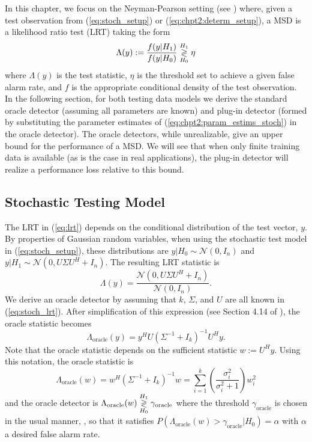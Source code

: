 In this chapter, we focus on the  Neyman-Pearson setting (see \cite{van1968detection}) where, given a test observation from (\ref{eq:stoch_setup}) or (\ref{eq:chpt2:determ_setup}), a MSD is a likelihood ratio test (LRT) taking the form
\begin{equation}\label{eq:lrt}
\Lambda(y):=\dfrac{f(y|H_1)}{f(y|H_0)} \detgtrless \eta
\end{equation}
where $\Lambda(y)$ is the test statistic, $\eta$ is the threshold set to achieve a given false alarm rate, and $f$ is the appropriate conditional density of the test observation. In the following section, for both testing data models we derive the standard oracle detector (assuming all parameters are known) and plug-in detector (formed by substituting the parameter estimates of (\ref{eq:chpt2:param_estims_stoch}) in the oracle detector). The oracle detectors, while unrealizable, give an upper bound for the performance of a MSD. We will see that when only finite training data is available (as is the case in real applications), the plug-in detector will realize a performance loss relative to this bound.

\subsection{Stochastic Testing Model}\label{sec:ieee_msd_plugin_stoch}
The LRT in (\ref{eq:lrt}) depends on the conditional distribution of the test vector, $y$. By properties of Gaussian random variables, when using the stochastic test model in (\ref{eq:stoch_setup}), these distributions are $y|H_0\sim\mathcal{N}\left(0,I_n\right)$ and $y|H_1\sim\mathcal{N}\left(0, U\Sigma U^H +I_n\right)$. The resulting LRT statistic is
\begin{equation}\label{eq:stoch_lrt}
\Lambda(y)=\frac{\mathcal{N}(0,U\Sigma U^H + I_n)}{\mathcal{N}(0,I_n)}.
\end{equation}
We derive an oracle detector by assuming that $k$, $\Sigma$, and $U$ are all known in (\ref{eq:stoch_lrt}). After simplification of this expression (see Section 4.14 of \cite{scharf1991statistical}), the oracle statistic becomes
\begin{equation}\label{eq:oracle_stat_stoch_y}
\Lambda_{\text{oracle}}(y) = y^HU\left(\Sigma^{-1}+I_k\right)^{-1}U^Hy.
\end{equation}
Note that the oracle statistic depends on the sufficient statistic $w:=U^Hy$. Using this notation, the oracle statistic is
\begin{equation}\label{eq:oracle_stat_stoch_w}
\boxed{\Lambda_{\text{oracle}}(w) = w^H\left(\Sigma^{-1}+I_k\right)^{-1}w = \sum_{i=1}^k\left(\frac{\sigma_i^2}{\sigma_i^2+1}\right)w_i^2}
\end{equation}
and the oracle detector is $\Lambda_{\text{oracle}}(w) \overset{H_1}{\underset{H_0}{\gtrless}} \gamma_{\text{oracle}}$
where the threshold $\gamma_{\text{oracle}}$ is chosen in the usual manner, \ie, so that it satisfies $P(\Lambda_{\text{oracle}}(w)>\gamma_{\text{oracle}}|H_0)=\alpha$ with $\alpha$ a desired false alarm rate.


